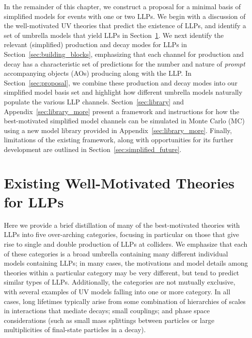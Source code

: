 In the remainder of this chapter, we construct a proposal for a minimal basis of simplified models for events with one or two LLPs.
We begin with a discussion of the well-motivated UV theories that predict the existence of LLPs, and identify a set of umbrella models that yield LLPs in Section~\ref{sec:motivated_theories}.
We next identify the relevant (simplified) production and decay modes for LLPs in Section~\ref{sec:building_blocks}, emphasizing that each channel for production and decay has a characteristic set of predictions for the number and nature of {\em prompt} accompanying objects (AOs) producing along with the LLP.
In Section~\ref{sec:proposal}, we combine these production and decay modes into our simplified model basis set and highlight how different umbrella models naturally populate the various LLP channels.
Section~\ref{sec:library} and Appendix~\ref{sec:library_more} present a framework and instructions for how the best-motivated simplified model channels can be simulated in Monte Carlo (MC) using a new model library provided in Appendix~\ref{sec:library_more}.
Finally, limitations of the existing framework, along with opportunities for its further development are outlined in Section~\ref{sec:simplified_future}.

\section{Existing Well-Motivated Theories for LLPs}\label{sec:motivated_theories}

Here we provide a brief distillation of many of the best-motivated theories with LLPs into five over-arching categories, focusing in particular on those that give rise to single and double production of LLPs at colliders.
We emphasize that each of these categories is a broad umbrella containing many different individual models containing LLPs; in many cases, the motivations and model details among theories within a particular category may be very different, but tend to predict similar types of LLPs. Additionally, the categories are not mutually exclusive, with several examples of UV models falling into one or more category.
In all cases, long lifetimes typically arise from some combination of hierarchies of scales in interactions that mediate decays; small couplings; and phase space considerations (such as small mass splittings between particles or large multiplicities of final-state particles in a decay).

